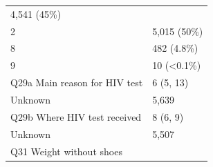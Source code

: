 \documentclass[]{article}
\begin{document}
\begin{longtable}[]{@{}ll@{}}
\begin{minipage}[t]{0.23\columnwidth}
4,541 (45\%)\strut
\end{minipage}\tabularnewline
\begin{minipage}[t]{0.71\columnwidth}\raggedright
2\strut
\end{minipage} & \begin{minipage}[t]{0.23\columnwidth}\raggedright
5,015 (50\%)\strut
\end{minipage}\tabularnewline
\begin{minipage}[t]{0.71\columnwidth}\raggedright
8\strut
\end{minipage} & \begin{minipage}[t]{0.23\columnwidth}\raggedright
482 (4.8\%)\strut
\end{minipage}\tabularnewline
\begin{minipage}[t]{0.71\columnwidth}\raggedright
9\strut
\end{minipage} & \begin{minipage}[t]{0.23\columnwidth}\raggedright
10 (\textless0.1\%)\strut
\end{minipage}\tabularnewline
\begin{minipage}[t]{0.71\columnwidth}\raggedright
Q29a Main reason for HIV test\strut
\end{minipage} & \begin{minipage}[t]{0.23\columnwidth}\raggedright
6 (5, 13)\strut
\end{minipage}\tabularnewline
\begin{minipage}[t]{0.71\columnwidth}\raggedright
Unknown\strut
\end{minipage} & \begin{minipage}[t]{0.23\columnwidth}\raggedright
5,639\strut
\end{minipage}\tabularnewline
\begin{minipage}[t]{0.71\columnwidth}\raggedright
Q29b Where HIV test received\strut
\end{minipage} & \begin{minipage}[t]{0.23\columnwidth}\raggedright
8 (6, 9)\strut
\end{minipage}\tabularnewline
\begin{minipage}[t]{0.71\columnwidth}\raggedright
Unknown\strut
\end{minipage} & \begin{minipage}[t]{0.23\columnwidth}\raggedright
5,507\strut
\end{minipage}\tabularnewline
\begin{minipage}[t]{0.71\columnwidth}\raggedright
Q31 Weight without shoes\strut

\end{minipage}
\end{longtable}
\end{document}
